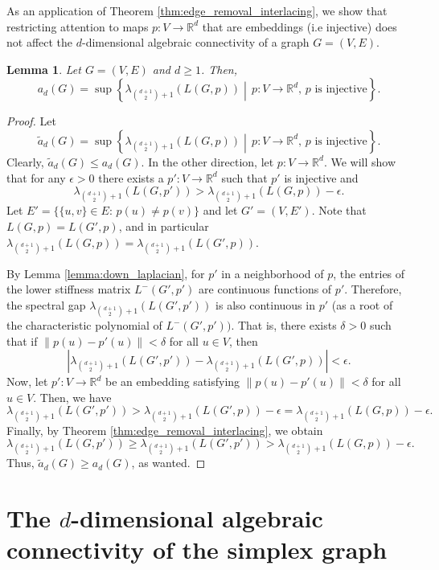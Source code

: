 \documentclass[a4paper,11pt]{article}
\theoremstyle{plain}
\newtheorem{lemma}[theorem]{\bf Lemma}
\theoremstyle{definition}
\newcommand{\Rea}{{\mathbb R}}
\begin{document}
As an application of Theorem \ref{thm:edge_removal_interlacing}, we show that restricting attention to maps $p:V\to \Rea^d$ that are embeddings (i.e injective) does not affect the $d$-dimensional algebraic connectivity of a graph $G=(V,E)$.

\begin{lemma}\label{lemma:a_d_for_embeddings}
Let $G=(V,E)$ and $d\geq 1$. Then,
\[
a_d(G)=\sup\left\{ \lambda_{\binom{d+1}{2}+1}(L(G,p)) \middle| \, p: V\to \Rea^d,\, p \text{ is injective}\right\}.
\]
\end{lemma}
\begin{proof}
Let
\[
\tilde{a}_d(G)=\sup\left\{ \lambda_{\binom{d+1}{2}+1}(L(G,p)) \middle| \, p: V\to \Rea^d,\, p \text{ is injective}\right\}.
\]
Clearly, $\tilde{a}_d(G)\leq a_d(G)$. 
In the other direction, let $p:V\to\Rea^d$. We will show that for any $\epsilon>0$ there exists a $p':V\to \Rea^d$ such that $p'$ is injective and
\[
    \lambda_{\binom{d+1}{2}+1}(L(G,p')) > \lambda_{\binom{d+1}{2}+1}(L(G,p))-\epsilon.
\]
Let $E'=\{\{u,v\}\in E:\, p(u)\neq p(v)\}$ and let
$G'=(V,E')$. Note that $L(G,p)=L(G',p)$, and in particular $\lambda_{\binom{d+1}{2}+1}(L(G,p))=\lambda_{\binom{d+1}{2}+1}(L(G',p))$.

By Lemma \ref{lemma:down_laplacian}, for $p'$ in a neighborhood of $p$, the entries of the lower stiffness matrix $L^{-}(G',p')$ are continuous functions of $p'$. Therefore, the spectral gap $\lambda_{\binom{d+1}{2}+1}(L(G',p'))$ is also continuous in $p'$ (as a root of the characteristic polynomial of $L^{-}(G',p'))$. That is, there exists $\delta>0$ such that if $\|p(u)-p'(u)\|<\delta$ for all $u\in V$, then
\[
    \left|\lambda_{\binom{d+1}{2}+1}(L(G',p'))-\lambda_{\binom{d+1}{2}+1}(L(G',p))\right|<\epsilon.
\]
Now, let $p':V\to\Rea^d$ be an embedding satisfying $\|p(u)-p'(u)\|< \delta$ for all $u\in V$. Then, we have
\[
\lambda_{\binom{d+1}{2}+1}(L(G',p'))> \lambda_{\binom{d+1}{2}+1}(L(G',p))-\epsilon = \lambda_{\binom{d+1}{2}+1}(L(G,p))-\epsilon.
\]
Finally, by Theorem \ref{thm:edge_removal_interlacing}, we obtain
\[
\lambda_{\binom{d+1}{2}+1}(L(G,p')) \geq \lambda_{\binom{d+1}{2}+1}(L(G',p'))> \lambda_{\binom{d+1}{2}+1}(L(G,p))-\epsilon.
\]
Thus, $\tilde{a}_d(G)\geq a_d(G)$, as wanted.
\end{proof}


\section{The $d$-dimensional algebraic connectivity of the simplex graph}
\label{sec:spec_simplex}
\end{document}
